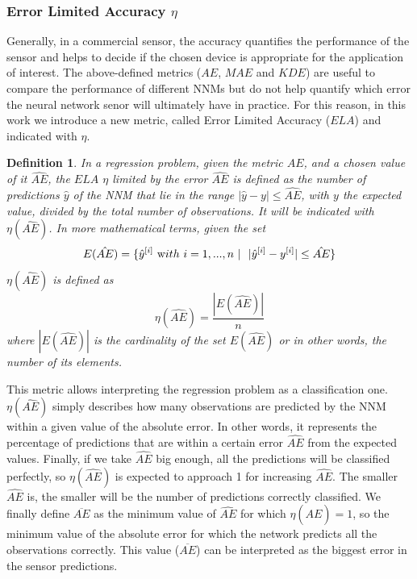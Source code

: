 \documentclass[sensors,article,submit,moreauthors,pdftex,10pt,a4paper]{Definitions/mdpi}
\newtheorem*{definition*}{Definition}
\begin{document}
\subsubsection{Error Limited Accuracy $\eta$}
\label{sektion:ela}

Generally, in a commercial sensor, the accuracy quantifies the performance of the sensor and helps to decide if the chosen device is appropriate for the application of interest. The above-defined metrics ($AE$, $MAE$ and $KDE$) are useful to compare the performance of different NNMs but do not help quantify which error the neural network senor will ultimately have in practice.
For this reason, in this work we introduce a new metric, called Error Limited Accuracy ($ELA$) and indicated with $\eta$.

\begin{definition*}
In a regression problem, given the metric $AE$, and a chosen value of it $\hat{AE}$, the $ELA$  $\eta$ limited by the error $\hat{AE}$ is defined as the number of predictions $\hat y$ of the NNM that lie in the range $|\hat y-y|\leq \hat{AE}$, with $y$ the expected value, divided by the total number of observations. It will be indicated with $\eta(\hat{AE})$. In more mathematical terms, given the set
\begin{equation}
E(\hat{AE}) = \{ \hat y^{[i]} \ {\text with } \ i = 1,..., n\ | \ \ |\hat y^{[i]}-y^{[i]}|\leq \hat{AE} \} 
\end{equation}
$\eta(\hat{AE})$ is defined as
\begin{equation}
\eta(\hat{AE}) = \frac{|E(\hat{AE})|}{n}
\end{equation}
where $|E(\hat{AE})|$ is the cardinality of the set $E(\hat{AE})$ or in other words, the number of its elements.
\end{definition*}

This metric allows interpreting the regression problem as a classification one. $\eta(\hat{AE})$ simply describes how many observations are predicted by the NNM within a given value of the absolute error. In other words, it represents the percentage of predictions that are within a certain error $\hat{AE}$ from the expected values. Finally, if we take $\hat{AE}$ big enough, all the predictions will be classified perfectly, so $\eta(\hat{AE})$ is expected to approach 1 for increasing $\hat{AE}$. The smaller $\hat{AE}$ is, the smaller will be the number of predictions correctly classified. We finally define $\overline{AE}$ as the minimum value of $\hat{AE}$ for which $\eta(\hat{AE})=1$, so the minimum value of the absolute error for which the network predicts all the observations correctly. This value ($\overline{AE}$) can be interpreted as the biggest error in the sensor predictions.
\end{document}
